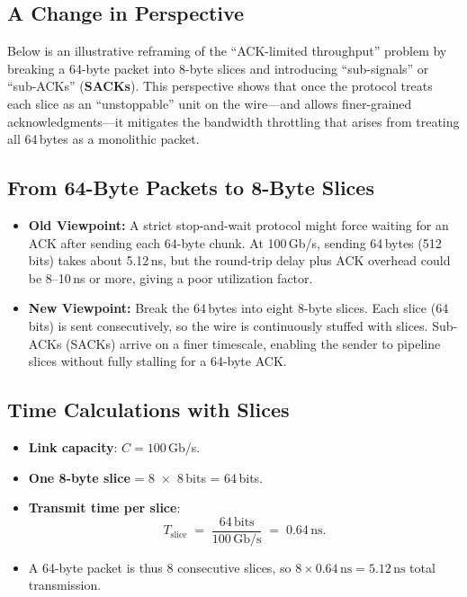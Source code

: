 \subsection*{A Change in Perspective}

Below is an illustrative reframing of the ``ACK-limited throughput'' problem by breaking a 64-byte packet into 8-byte slices and introducing ``sub-signals'' or ``sub-ACKs'' (\textbf{SACKs}). This perspective shows that once the protocol treats each slice as an ``unstoppable'' unit on the wire---and allows finer-grained acknowledgments---it mitigates the bandwidth throttling that arises from treating all 64\,bytes as a monolithic packet.

\subsection{From 64-Byte Packets to 8-Byte Slices}

\begin{itemize}
\item \textbf{Old Viewpoint:} A strict stop-and-wait protocol might force waiting for an ACK after sending each 64-byte chunk.  
At 100\,Gb/s, sending 64\,bytes (512 bits) takes about 5.12\,ns, but the round-trip delay plus ACK overhead could be 8--10\,ns or more, giving a poor utilization factor.

\item \textbf{New Viewpoint:} 
Break the 64\,bytes into eight 8-byte slices. Each slice (64 bits) is sent consecutively, so the wire is continuously stuffed with slices. Sub-ACKs (SACKs) arrive on a finer timescale, enabling the sender to pipeline slices without fully stalling for a 64-byte ACK.
\end{itemize}

\subsection{Time Calculations with Slices}

\begin{itemize}
\item \textbf{Link capacity}: $C = 100$\,Gb/s.
\item \textbf{One 8-byte slice} = 8~$\times$~8\,bits = 64\,bits.
\item \textbf{Transmit time per slice}:
\[
  T_{\text{slice}} \;=\; \frac{64 \,\text{bits}}{100\,\text{Gb/s}}
  \;=\; 0.64\,\text{ns}.
\]
\item A 64-byte packet is thus 8 consecutive slices, so $8 \times 0.64\,\text{ns} = 5.12\,\text{ns}$ total transmission. 
\end{itemize}

